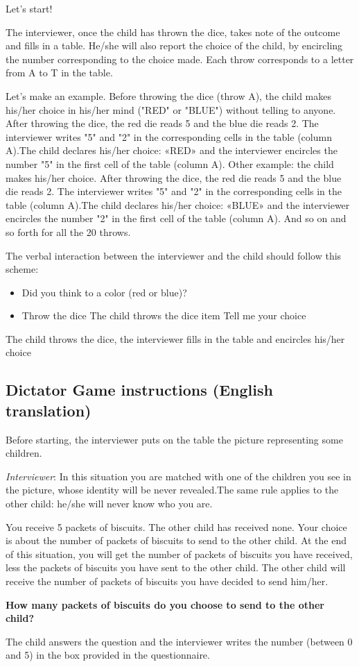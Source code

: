 \documentclass[authoryear, preprint, review, 12pt]{elsarticle}
\begin{document}
Let's start!

The interviewer, once the child has thrown the dice, takes note of the outcome and fills in a table. He/she will also report the choice of the child, by encircling the number corresponding to the choice made. Each throw corresponds to a letter from A to T in the table.

Let's make an example. 
Before throwing the dice (throw A), the child makes his/her choice in his/her mind ("RED" or "BLUE") without telling to anyone. After throwing the dice, the red die reads 5 and the blue die reads 2. The interviewer writes "5" and "2" in the corresponding cells in the table (column A).The child declares his/her choice: «RED» and the interviewer encircles the number "5" in the first cell of the table (column A). 
Other example: the child makes his/her choice. After throwing the dice, the red die reads 5 and the blue die reads 2. The interviewer writes "5" and "2" in the corresponding cells in the table (column A).The child declares his/her choice: «BLUE» and the interviewer encircles the number "2" in the first cell of the table (column A). 
And so on and so forth for all the 20 throws.

The verbal interaction between the interviewer and the child should follow this scheme:

\begin{itemize}
    \item Did you think to a color (red or blue)?
    \item Throw the dice
    The child throws the dice
    item Tell me your choice
\end{itemize}

The child throws the dice, the interviewer fills in the table and encircles his/her choice


\subsection{Dictator Game instructions (English translation)}

Before starting, the interviewer puts on the table the picture representing some children. 

\textit{Interviewer}: 
In this situation you are matched with one of the children you see in the picture, whose identity will be never revealed.The same rule applies to the other child: he/she will never know who you are.

You receive 5 packets of biscuits. The other child has received none. Your choice is about the number of packets of biscuits to send to the other child. At the end of this situation, you will get the number of packets of biscuits you have received, less the packets of biscuits you have sent to the other child. The other child will receive the number of packets of biscuits you have decided to send him/her.

\textbf{How many packets of biscuits do you choose to send to the other child?}

The child answers the question and the interviewer writes the number (between 0 and 5) in the box provided in the questionnaire.

\clearpage
\end{document}
